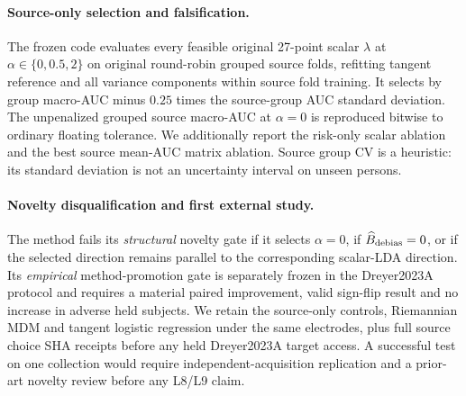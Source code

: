 \paragraph{Source-only selection and falsification.}
The frozen code evaluates every feasible original 27-point scalar
$\lambda$ at $\alpha\in\{0,0.5,2\}$ on original round-robin
grouped source folds, refitting tangent reference and all
variance components within source fold training. It selects by
group macro-AUC minus $0.25$ times the source-group AUC standard
deviation. The unpenalized grouped source macro-AUC at
$\alpha=0$ is reproduced bitwise to ordinary floating tolerance.
We additionally report the risk-only scalar ablation and
the best source mean-AUC matrix ablation. Source group CV
is a heuristic: its standard deviation is not an uncertainty
interval on unseen persons.

\paragraph{Novelty disqualification and first external study.}
The method fails its \emph{structural} novelty gate if it selects
$\alpha=0$, if $\widehat B_{\rm debias}=0$, or if the selected
direction remains parallel to the corresponding scalar-LDA
direction. Its \emph{empirical} method-promotion gate is
separately frozen in the Dreyer2023A protocol and requires
a material paired improvement, valid sign-flip result and
no increase in adverse held subjects.
We retain the source-only controls, Riemannian MDM and
tangent logistic regression under the same electrodes,
plus full source choice SHA receipts before any held
Dreyer2023A target access. A successful test on one
collection would require independent-acquisition replication
and a prior-art novelty review before any L8/L9 claim.
